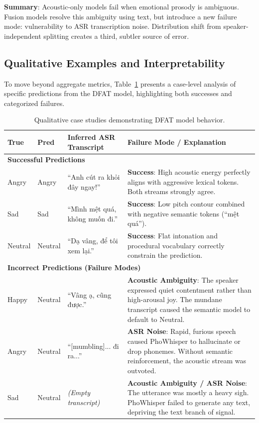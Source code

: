 \documentclass[12pt,a4paper]{report}
\begin{document}
\textbf{Summary}: Acoustic-only models fail when emotional prosody is ambiguous. Fusion models resolve this ambiguity using text, but introduce a new failure mode: vulnerability to ASR transcription noise. Distribution shift from speaker-independent splitting creates a third, subtler source of error.

\subsection{Qualitative Examples and Interpretability}
To move beyond aggregate metrics, Table~\ref{tab:qualitative} presents a case-level analysis of specific predictions from the DFAT model, highlighting both successes and categorized failures.

\begin{table}[h]
\centering
\small
\begin{tabular}{p{1.5cm} p{1.5cm} p{4.5cm} p{6.5cm}}
\toprule
\textbf{True} & \textbf{Pred} & \textbf{Inferred ASR Transcript} & \textbf{Failure Mode / Explanation} \\
\midrule
\multicolumn{4}{l}{\textbf{Successful Predictions}} \\
\midrule
Angry & Angry & ``Anh cút ra khỏi đây ngay!'' & \textbf{Success}: High acoustic energy perfectly aligns with aggressive lexical tokens. Both streams strongly agree. \\
Sad & Sad & ``Mình mệt quá, không muốn đi.'' & \textbf{Success}: Low pitch contour combined with negative semantic tokens (``mệt quá''). \\
Neutral & Neutral & ``Dạ vâng, để tôi xem lại.'' & \textbf{Success}: Flat intonation and procedural vocabulary correctly constrain the prediction. \\
\midrule
\multicolumn{4}{l}{\textbf{Incorrect Predictions (Failure Modes)}} \\
\midrule
Happy & Neutral & ``Vâng ạ, cũng được.'' & \textbf{Acoustic Ambiguity}: The speaker expressed quiet contentment rather than high-arousal joy. The mundane transcript caused the semantic model to default to Neutral. \\
Angry & Neutral & ``[mumbling]... đi ra...'' & \textbf{ASR Noise}: Rapid, furious speech caused PhoWhisper to hallucinate or drop phonemes. Without semantic reinforcement, the acoustic stream was outvoted. \\
Sad & Neutral & \textit{(Empty transcript)} & \textbf{Acoustic Ambiguity / ASR Noise}: The utterance was mostly a heavy sigh. PhoWhisper failed to generate any text, depriving the text branch of signal. \\
\bottomrule
\end{tabular}
\caption{Qualitative case studies demonstrating DFAT model behavior.}
\label{tab:qualitative}
\end{table}
\end{document}
